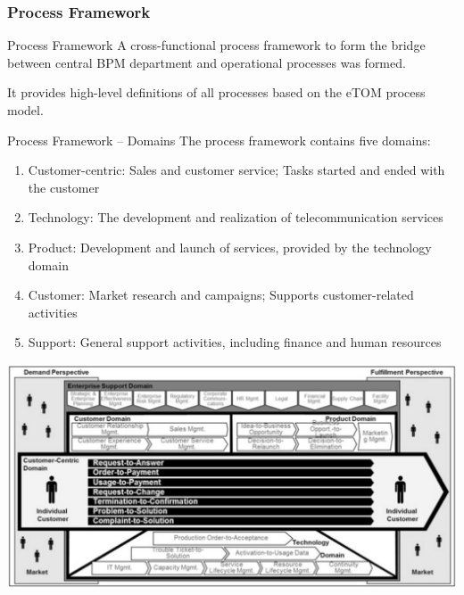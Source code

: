 \documentclass{beamer}
\begin{document}
\subsubsection{Process Framework}
\begin{frame}{Process Framework}
    A cross-functional process framework to form the bridge between central BPM department and operational processes was formed.

    \vspace{1em}

    It provides high-level definitions of all processes based on the eTOM process model.
\end{frame}

\begin{frame}{Process Framework -- Domains}
    The process framework contains five domains:
    \begin{enumerate}[1.]
        \item Customer-centric: Sales and customer service; Tasks started and ended with the customer
        \item Technology: The development and realization of telecommunication services
        \item Product: Development and launch of services, provided by the technology domain
        \item Customer: Market research and campaigns; Supports customer-related activities
        \item Support: General support activities, including finance and human resources
    \end{enumerate}
\end{frame}

\begin{frame}
    \begin{center}
        \includegraphics[width=1.0\textwidth]{proj_procFramework.png}
    \end{center}
\end{frame}
\end{document}
